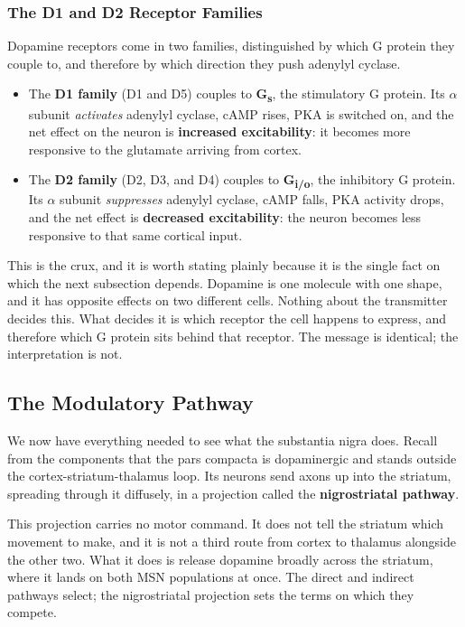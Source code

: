 \documentclass[11pt]{article}
\begin{document}
\subsubsection{The D1 and D2 Receptor Families}

Dopamine receptors come in two families, distinguished by which G protein they couple to, and therefore by which direction they push adenylyl cyclase.

\begin{itemize}
    \item The \textbf{D1 family} (D1 and D5) couples to \textbf{G\textsubscript{s}}, the stimulatory G protein. Its $\alpha$ subunit \textit{activates} adenylyl cyclase, cAMP rises, PKA is switched on, and the net effect on the neuron is \textbf{increased excitability}: it becomes more responsive to the glutamate arriving from cortex.
    \item The \textbf{D2 family} (D2, D3, and D4) couples to \textbf{G\textsubscript{i/o}}, the inhibitory G protein. Its $\alpha$ subunit \textit{suppresses} adenylyl cyclase, cAMP falls, PKA activity drops, and the net effect is \textbf{decreased excitability}: the neuron becomes less responsive to that same cortical input.
\end{itemize}

This is the crux, and it is worth stating plainly because it is the single fact on which the next subsection depends. Dopamine is one molecule with one shape, and it has opposite effects on two different cells. Nothing about the transmitter decides this. What decides it is which receptor the cell happens to express, and therefore which G protein sits behind that receptor. The message is identical; the interpretation is not.

\subsection{The Modulatory Pathway}

We now have everything needed to see what the substantia nigra does. Recall from the components that the pars compacta is dopaminergic and stands outside the cortex-striatum-thalamus loop. Its neurons send axons up into the striatum, spreading through it diffusely, in a projection called the \textbf{nigrostriatal pathway}.

This projection carries no motor command. It does not tell the striatum which movement to make, and it is not a third route from cortex to thalamus alongside the other two. What it does is release dopamine broadly across the striatum, where it lands on both MSN populations at once. The direct and indirect pathways select; the nigrostriatal projection sets the terms on which they compete.
\end{document}

